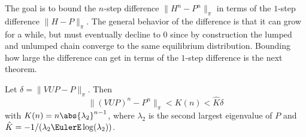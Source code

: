 \documentclass[12pt]{article}
\begin{document}
The goal is to bound the $n$-step difference $\| H^n - P^n \|_{\pi}$ in
terms of the $1$-step difference $\| H - P\|_{\pi}$.  The general
behavior of the difference  is that it can grow for a while, but must
eventually decline to $0$ since by construction the lumped and
unlumped chain converge to the same equilibrium distribution.
Bounding how large the difference can get in terms of the $1$-step
difference is the next theorem.

\begin{theorem}
  Let $ \delta = \| VUP - P \|_{\pi}$.  Then
  \[
    \| (VUP)^n - P^n \|_{\pi} < K(n) < \hat{K} \delta
  \]
  with $K(n) = n \abs{\lambda_2}^{n-1}$, where $\lambda_2$ is the
  second largest eigenvalue of $P$ and $\hat{K} = -1/(\lambda_2
  \EulerE \log(\lambda_2))$.
\end{theorem}
\end{document}
